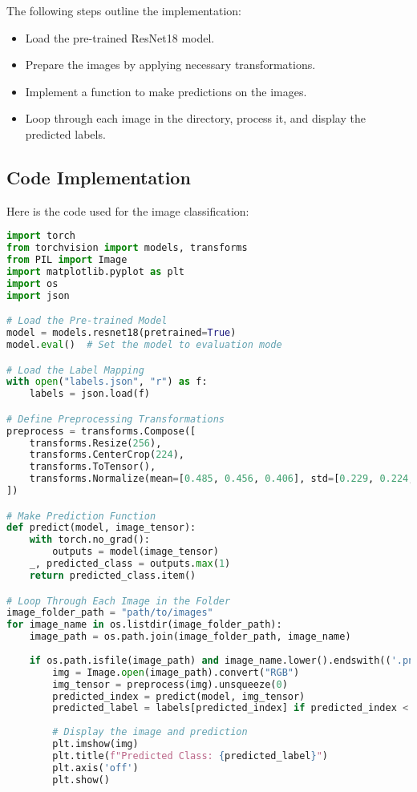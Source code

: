 \documentclass{article}
\begin{document}
The following steps outline the implementation:

\begin{itemize}
    \item Load the pre-trained ResNet18 model.
    \item Prepare the images by applying necessary transformations.
    \item Implement a function to make predictions on the images.
    \item Loop through each image in the directory, process it, and display the predicted labels.
\end{itemize}

\subsection{Code Implementation}

Here is the code used for the image classification:

\begin{lstlisting}[language=Python, caption=Image Classification Code]
import torch
from torchvision import models, transforms
from PIL import Image
import matplotlib.pyplot as plt
import os
import json

# Load the Pre-trained Model
model = models.resnet18(pretrained=True)
model.eval()  # Set the model to evaluation mode

# Load the Label Mapping
with open("labels.json", "r") as f:
    labels = json.load(f)

# Define Preprocessing Transformations
preprocess = transforms.Compose([
    transforms.Resize(256),
    transforms.CenterCrop(224),
    transforms.ToTensor(),
    transforms.Normalize(mean=[0.485, 0.456, 0.406], std=[0.229, 0.224, 0.225]),
])

# Make Prediction Function
def predict(model, image_tensor):
    with torch.no_grad():
        outputs = model(image_tensor)
    _, predicted_class = outputs.max(1)
    return predicted_class.item()

# Loop Through Each Image in the Folder
image_folder_path = "path/to/images"
for image_name in os.listdir(image_folder_path):
    image_path = os.path.join(image_folder_path, image_name)
    
    if os.path.isfile(image_path) and image_name.lower().endswith(('.png', '.jpg', '.jpeg')):
        img = Image.open(image_path).convert("RGB")
        img_tensor = preprocess(img).unsqueeze(0)
        predicted_index = predict(model, img_tensor)
        predicted_label = labels[predicted_index] if predicted_index < len(labels) else "Unknown"
        
        # Display the image and prediction
        plt.imshow(img)
        plt.title(f"Predicted Class: {predicted_label}")
        plt.axis('off')
        plt.show()
\end{lstlisting}
\newpage
\end{document}
